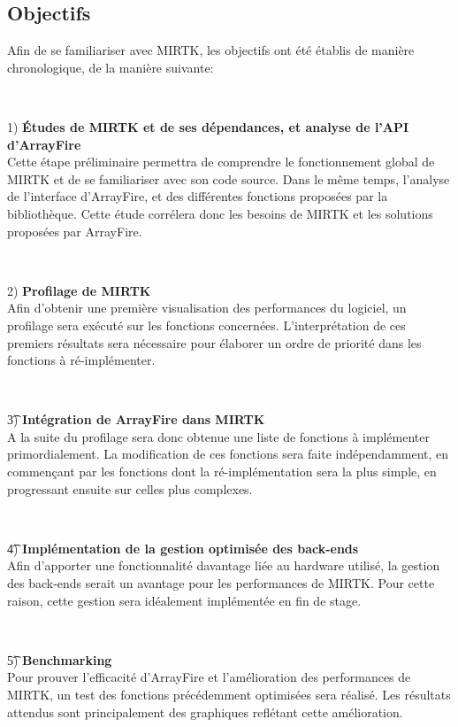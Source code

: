 \documentclass[10pt]{report}
\begin{document}
	\subsection{Objectifs} 
	Afin de se familiariser avec MIRTK, les objectifs ont été établis de manière chronologique, de la manière suivante: 
	~\par~\par 
	1) \textbf{Études de MIRTK et de ses dépendances, et analyse de l'API d'ArrayFire} \\
	Cette étape préliminaire permettra de comprendre le fonctionnement global de MIRTK et de se familiariser avec son code source. Dans le même temps, l'analyse de l'interface d'ArrayFire, et des différentes fonctions proposées par la bibliothèque. Cette étude corrélera donc les besoins de MIRTK et les solutions proposées par ArrayFire.
	~\par~\par 
	2) \textbf{Profilage de MIRTK}\\
	Afin d'obtenir une première visualisation des performances du logiciel, un profilage sera exécuté sur les fonctions concernées. L'interprétation de ces premiers résultats sera nécessaire pour élaborer un ordre de priorité dans les fonctions à ré-implémenter.
	~\par~\par 
	\t 3) \textbf{Intégration de ArrayFire dans MIRTK} \\
	A la suite du profilage sera donc obtenue une liste de fonctions à implémenter primordialement. La modification de ces fonctions sera faite indépendamment, en commençant par les fonctions dont la ré-implémentation sera la plus simple, en progressant ensuite sur celles plus complexes.
	~\par~\par
	\t 4) \textbf{Implémentation de la gestion optimisée des back-ends} \\
	Afin d'apporter une fonctionnalité davantage liée au hardware utilisé, la gestion des back-ends serait un avantage pour les performances de MIRTK. Pour cette raison, cette gestion sera idéalement implémentée en fin de stage. 
	~\par~\par 
	\t 5) \textbf{Benchmarking} \\
	Pour prouver l'efficacité d'ArrayFire et l'amélioration des performances de MIRTK, un test des fonctions précédemment optimisées sera réalisé. Les résultats attendus sont principalement des graphiques reflétant cette amélioration.
\end{document}
